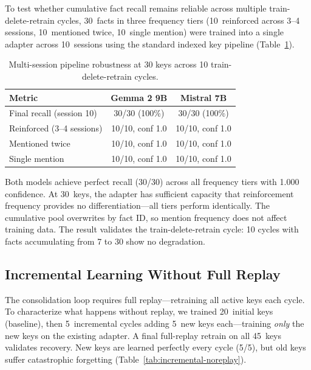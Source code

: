 \documentclass[11pt]{article}
\begin{document}
To test whether cumulative fact recall remains reliable across multiple train-delete-retrain cycles, 30~facts in three frequency tiers (10~reinforced across 3--4 sessions, 10~mentioned twice, 10~single mention) were trained into a single adapter across 10~sessions using the standard indexed key pipeline (Table~\ref{tab:reinforcement}).

\begin{table}[t]
\centering
\caption{Multi-session pipeline robustness at 30 keys across 10 train-delete-retrain cycles.}
\label{tab:reinforcement}
\small
\begin{tabular}{lcc}
\toprule
Metric & Gemma 2 9B & Mistral 7B \\
\midrule
Final recall (session 10) & 30/30 (100\%) & 30/30 (100\%) \\
Reinforced (3--4 sessions) & 10/10, conf 1.0 & 10/10, conf 1.0 \\
Mentioned twice & 10/10, conf 1.0 & 10/10, conf 1.0 \\
Single mention & 10/10, conf 1.0 & 10/10, conf 1.0 \\
\bottomrule
\end{tabular}
\end{table}

Both models achieve perfect recall (30/30) across all frequency tiers with 1.000 confidence.
At 30~keys, the adapter has sufficient capacity that reinforcement frequency provides no differentiation---all tiers perform identically.
The cumulative pool overwrites by fact ID, so mention frequency does not affect training data.
The result validates the train-delete-retrain cycle: 10 cycles with facts accumulating from 7 to 30 show no degradation.

\subsection{Incremental Learning Without Full Replay}
\label{sec:exp-incremental-noreplay}

The consolidation loop requires full replay---retraining all active keys each cycle.
To characterize what happens without replay, we trained 20~initial keys (baseline), then 5~incremental cycles adding 5~new keys each---training \emph{only} the new keys on the existing adapter.
A final full-replay retrain on all 45~keys validates recovery.
New keys are learned perfectly every cycle (5/5), but old keys suffer catastrophic forgetting (Table~\ref{tab:incremental-noreplay}).
\end{document}
